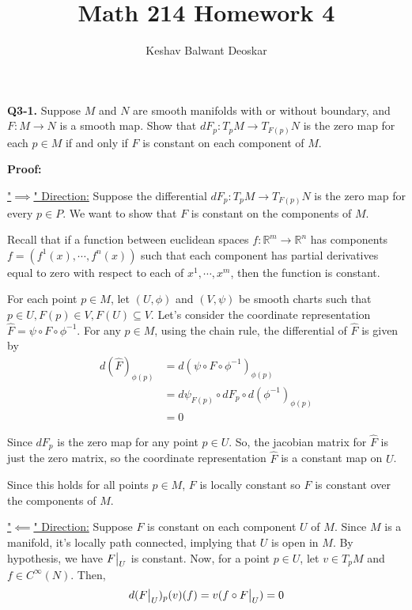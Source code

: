 \documentclass{article}
\title{Math 214 Homework 4}
\author{Keshav Balwant Deoskar}
\newcommand{\R}{\mathbb{R}}
\newcommand{\restr}[2]{{%
  \left.\kern-\nulldelimiterspace %
  #1 %
  \vphantom{\big|} %
  \right|_{#2} %
  }}
\begin{document}
\maketitle



\textbf{Q3-1.} Suppose $M$ and $N$ are smooth manifolds with or without boundary, and $F : M \rightarrow N$ is a smooth map. Show that $dF_p : T_pM \rightarrow T_{F(p)}N$ is the zero map for each $p \in M$ if and only if $F$ is constant on each component of $M$.

\vskip 0.5cm
\textbf{Proof:}

\vskip 0.5cm
\underline{"$\implies$" Direction:} Suppose the differential $dF_p : T_p M \rightarrow T_{F(p)} N$ is the zero map for every $p \in P$.  We want to show that $F$ is constant on the components of $M$.

\vskip 0.5cm
Recall that if a function between euclidean spaces $f : \R^m \rightarrow \R^n$ has components $f = (f^1(x), \cdots, f^n(x))$ such that each component has partial derivatives equal to zero with respect to each of $x^1, \cdots, x^m$, then the function is constant.


\vskip 0.5cm
For each point $p \in M$, let $(U, \phi)$ and $(V, \psi)$ be smooth charts such that $p \in U, F(p) \in V, F(U) \subseteq V$. Let's consider the coordinate representation $\hat{F} = \psi \circ F \circ \phi^{-1}$. For any $p \in M$, using the chain rule, the differential of $\hat{F}$ is given by 
\begin{align*}
  d(\hat{F})_{\phi(p)} &= d\left( \psi \circ F \circ \phi^{-1} \right)_{\phi(p)} \\
  &= d\psi_{F(p)} \circ dF_{p} \circ d\left( \phi^{-1} \right)_{\phi(p)} \\
  &= 0
\end{align*}

Since $dF_p$ is the zero map for any point $p \in U$. So, the jacobian matrix for $\hat{F}$ is just the zero matrix, so the coordinate representation $\hat{F}$ is a constant map on $U$. 

\vskip 0.5cm
Since this holds for all points $p \in M$, $F$ is locally constant so $F$ is constant over the components of $M$.

\vskip 0.5cm
\underline{"$\impliedby$" Direction:} Suppose $F$ is constant on each component $U$ of $M$. Since $M$ is a manifold, it's locally path connected, implying that $U$ is open in $M$. By hypothesis, we have $\restr{F}{U}$ is constant. Now, for a point $p \in U$, let $v \in T_p M$ and $f \in C^{\infty}(N)$. Then, 
\begin{align*}
  d(\restr{F}{U})_p(v)(f) = v(f \circ \restr{F}{U}) = 0
\end{align*}
\end{document}
